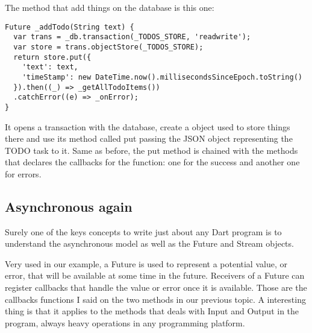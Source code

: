 The method that add things on the database is this one:

\begin{lstlisting}[label=dpoint,caption=Dart stores stuff]
Future _addTodo(String text) {
  var trans = _db.transaction(_TODOS_STORE, 'readwrite');
  var store = trans.objectStore(_TODOS_STORE);
  return store.put({
    'text': text,
    'timeStamp': new DateTime.now().millisecondsSinceEpoch.toString()
  }).then((_) => _getAllTodoItems())
  .catchError((e) => _onError);
}
\end{lstlisting}

It opens a transaction \cite{4_11} with the
database, create a object used to store things there and use its method called
put passing the JSON object representing the TODO task to it. Same as before,
the put method is chained with the methods that declares the callbacks for the
function: one for the success and another one for errors.

\subsection{Asynchronous again}

Surely one of the keys concepts to write just about any Dart program is to
understand the asynchronous model as well as the
Future \cite{4_12} and
Stream \cite{4_13} objects.

Very used in our example, a Future is used to represent a potential value, or
error, that will be available at some time in the future. Receivers of a Future
can register callbacks that handle the value or error once it is available.
Those are the callbacks functions I said on the two methods in our previous
topic. A interesting thing is that it applies to the methods that deals with
Input and Output in the program, always heavy operations in any programming
platform.
